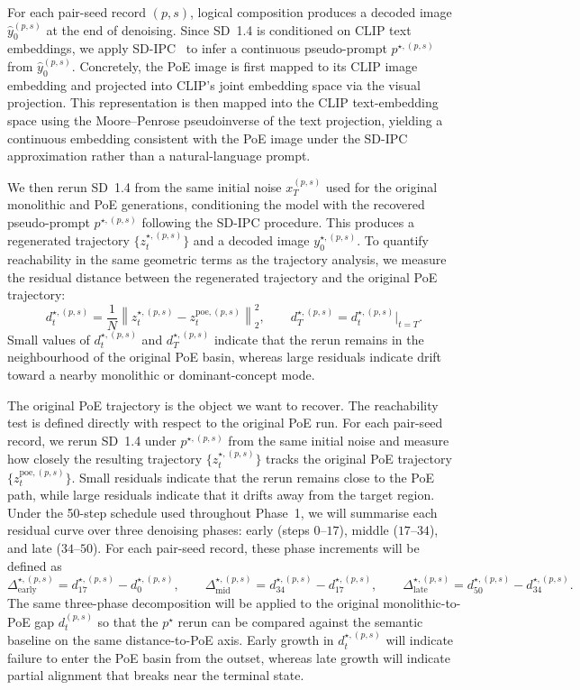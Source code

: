 For each pair-seed record $(p,s)$, logical composition produces a decoded image 
$\hat y_0^{(p,s)}$ at the end of denoising. 
Since SD~1.4 is conditioned on CLIP text embeddings, we apply SD-IPC~\citep{clip_inverter} 
to infer a continuous pseudo-prompt $p^{\star,(p,s)}$ from $\hat y_0^{(p,s)}$. 
Concretely, the PoE image is first mapped to its CLIP image embedding 
and projected into CLIP's joint embedding space via the visual projection. 
This representation is then mapped into the CLIP text-embedding space using the 
Moore--Penrose pseudoinverse of the text projection, yielding a continuous embedding 
consistent with the PoE image under the SD-IPC approximation rather than a natural-language prompt.

We then rerun SD~1.4 from the same initial noise $x_T^{(p,s)}$ used for the original 
monolithic and PoE generations, conditioning the model with the recovered pseudo-prompt 
$p^{\star,(p,s)}$ following the SD-IPC procedure. This produces a regenerated trajectory 
$\{z_t^{\star,(p,s)}\}$ and a decoded image $y_0^{\star,(p,s)}$. To quantify reachability 
in the same geometric terms as the trajectory analysis, we measure the residual distance 
between the regenerated trajectory and the original PoE trajectory:
\[
d_t^{\star,(p,s)}=\frac{1}{N}\left\|z_t^{\star,(p,s)}-z_t^{\mathrm{poe},(p,s)}\right\|_2^2,
\qquad
d_T^{\star,(p,s)}=d_t^{\star,(p,s)}\big|_{t=T}.
\]
Small values of $d_t^{\star,(p,s)}$ and $d_T^{\star,(p,s)}$ indicate that the rerun remains 
in the neighbourhood of the original PoE basin, whereas large residuals indicate drift 
toward a nearby monolithic or dominant-concept mode.

The original PoE trajectory is the object we want to recover. The reachability test is defined directly with respect to the original PoE run. 
For each pair-seed record, we rerun SD~1.4 under \(p^{\star,(p,s)}\) from the same initial noise and measure how closely the resulting trajectory \(\{z_t^{\star,(p,s)}\}\) tracks the original PoE trajectory \(\{z_t^{\mathrm{poe},(p,s)}\}\). 
Small residuals indicate that the rerun remains close to the PoE path, while large residuals indicate that it drifts away from the target region.
Under the 50-step schedule used throughout Phase~1, we will summarise each residual curve over three denoising phases: early (steps $0$--$17$), middle ($17$--$34$), and late ($34$--$50$). For each pair-seed record, these phase increments will be defined as
\[
\Delta_{\mathrm{early}}^{\star,(p,s)} = d_{17}^{\star,(p,s)} - d_{0}^{\star,(p,s)}, \qquad
\Delta_{\mathrm{mid}}^{\star,(p,s)} = d_{34}^{\star,(p,s)} - d_{17}^{\star,(p,s)}, \qquad
\Delta_{\mathrm{late}}^{\star,(p,s)} = d_{50}^{\star,(p,s)} - d_{34}^{\star,(p,s)}.
\]
The same three-phase decomposition will be applied to the original monolithic-to-PoE gap $d_t^{(p,s)}$ so that the $p^\star$ rerun can be compared against the semantic baseline on the same distance-to-PoE axis. Early growth in $d_t^{\star,(p,s)}$ will indicate failure to enter the PoE basin from the outset, whereas late growth will indicate partial alignment that breaks near the terminal state.


